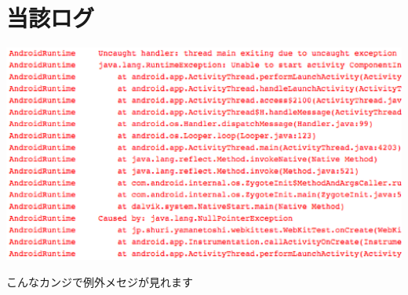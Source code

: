 \documentclass[slide,papersize]{jsarticle}
\begin{document}
\section*{当該ログ}
\begin{center}
\includegraphics[scale=0.3]{nulpoLog.eps}
\end{center}
こんなカンジで例外メセジが見れます
\end{document}

